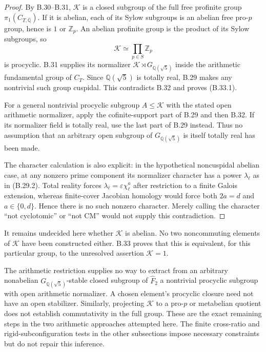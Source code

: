 \begin{proof}
By B.30--B.31, $\mathcal K$ is a closed subgroup
of the full free profinite group
$\pi_1(C_{T,\overline{\mathbb Q}})$.
If it is abelian, each of its Sylow subgroups
is an abelian free pro-$p$ group, hence is
$1$ or $\mathbb Z_p$.  An abelian profinite
group is the product of its Sylow subgroups,
so
\[
                        \mathcal K\simeq\prod_{p\in S}\mathbb Z_p
\]
is procyclic.  B.31 supplies its normalizer
$\mathcal K\rtimes G_{\mathbb Q(\sqrt5)}$
inside the arithmetic fundamental group of
$C_T$.  Since $\mathbb Q(\sqrt5)$ is totally
real, B.29 makes any nontrivial such group
cuspidal.  This contradicts B.32 and proves
(B.33.1).

For a general nontrivial procyclic subgroup
$A\leq\mathcal K$ with the stated open
arithmetic normalizer, apply the cofinite-support
part of B.29 and then B.32.  If its normalizer
field is totally real, use the last part of
B.29 instead.  Thus no assumption that an
arbitrary open subgroup of $G_{\mathbb Q(\sqrt5)}$
is itself totally real has been made.

The character calculation is also explicit:
in the hypothetical noncuspidal abelian case,
at any nonzero prime component its normalizer
character has a power $\lambda_\ell$ as in
(B.29.2).  Total reality forces
$\lambda_\ell=\varepsilon\chi_\ell^a$ after
restriction to a finite Galois extension,
whereas finite-cover Jacobian homology would
force both $2a=d$ and $a\in\{0,d\}$.  Hence
there is no such nonzero character.  Merely
calling the character ``not cyclotomic'' or
``not CM'' would not supply this contradiction.
\end{proof}

It remains undecided here whether $\mathcal K$ is
abelian.  No two noncommuting elements of
$\mathcal K$ have been constructed either.
B.33 proves that this is equivalent, for this
particular group, to the unresolved assertion
$\mathcal K=1$.

The arithmetic restriction supplies no way to
extract from an arbitrary nonabelian
$G_{\mathbb Q(\sqrt5)}$-stable closed subgroup
of $\widehat F_2$ a nontrivial procyclic subgroup
with open arithmetic normalizer.  A chosen
element's procyclic closure need not have an
open stabilizer.  Similarly, projecting
$\mathcal K$ to a pro-$p$ or metabelian
quotient does not establish commutativity
in the full group.  These are the exact
remaining steps in the two arithmetic
approaches attempted here.  The finite
cross-ratio and rigid-subconfiguration tests
in the other subsections impose necessary
constraints but do not repair this inference.
